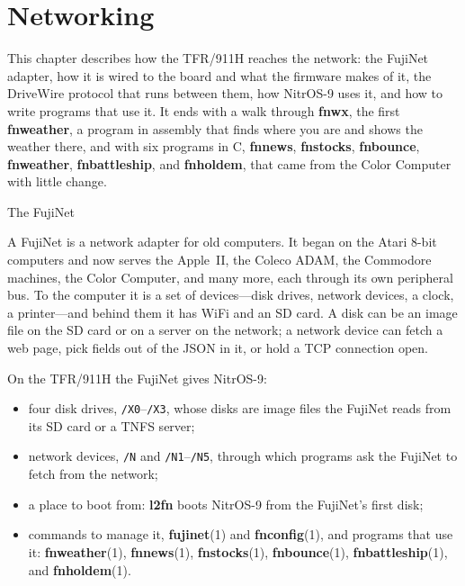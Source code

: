 \documentclass[10pt,twoside,openany]{book}
\makeatletter
\newcommand{\cmd}[1]{\textbf{#1}}            %
\newcommand{\file}[1]{\texttt{#1}}           %
\newcommand{\rp}[2]{\textbf{#1}(#2)}         %
\newcommand{\thesectname}{}
\newcommand{\chapterpages}{%
  \renewcommand{\thepage}{\thechapter--\arabic{page}}\setcounter{page}{1}}
\renewcommand{\section}{\@startsection{section}{1}{0pt}{3.2ex plus 1ex}{1.2ex}%
  {\sffamily\bfseries\large}}
\makeatother
\begin{document}
\chapter{Networking}
\chapterpages
\renewcommand{\thesectname}{Networking}

This chapter describes how the TFR/911H reaches the network: the FujiNet
adapter, how it is wired to the board and what the firmware makes of it,
the DriveWire protocol that runs between them, how NitrOS-9 uses it, and
how to write programs that use it. It ends with a walk through
\cmd{fnwx}, the first \cmd{fnweather}, a program in assembly that finds
where you are and shows the weather there, and with six programs in C,
\cmd{fnnews}, \cmd{fnstocks}, \cmd{fnbounce}, \cmd{fnweather},
\cmd{fnbattleship}, and \cmd{fnholdem}, that came from the Color Computer
with little change.

\section{The FujiNet}

A FujiNet is a network adapter for old computers. It began on the Atari
8-bit computers and now serves the Apple~II, the Coleco ADAM, the
Commodore machines, the Color Computer, and many more, each through its
own peripheral bus. To the computer it is a set of devices---disk drives,
network devices, a clock, a printer---and behind them it has WiFi and an
SD card. A disk can be an image file on the SD card or on a server on the
network; a network device can fetch a web page, pick fields out of the
JSON in it, or hold a TCP connection open.

On the TFR/911H the FujiNet gives NitrOS-9:
\begin{itemize}\setlength{\itemsep}{0pt}
\item four disk drives, \file{/X0}--\file{/X3}, whose disks are image files
the FujiNet reads from its SD card or a TNFS server;
\item network devices, \file{/N} and \file{/N1}--\file{/N5}, through which
programs ask the FujiNet to fetch from the network;
\item a place to boot from: \cmd{l2fn} boots NitrOS-9 from the FujiNet's
first disk;
\item commands to manage it, \rp{fujinet}{1} and \rp{fnconfig}{1}, and
programs that use it: \rp{fnweather}{1}, \rp{fnnews}{1},
\rp{fnstocks}{1}, \rp{fnbounce}{1}, \rp{fnbattleship}{1}, and
\rp{fnholdem}{1}.
\end{itemize}
\end{document}
